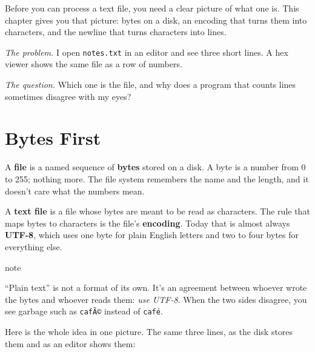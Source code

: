 
\begin{chapterintro}

Before you can process a text file, you need a clear picture of what one is. This chapter gives you that picture: bytes on a disk, an encoding that turns them into characters, and the newline that turns characters into lines.

\end{chapterintro}

\emph{The problem.} I open \texttt{notes.txt} in an editor and see three short lines. A hex viewer shows the same file as a row of numbers.

\emph{The question.} Which one is the file, and why does a program that counts lines sometimes disagree with my eyes?

\section{Bytes First}\label{01-what-a-text-file-is:bytes-first}

A \textbf{file} is a named sequence of \textbf{bytes} stored on a disk. A byte is a number from 0 to 255; nothing more. The file system remembers the name and the length, and it doesn't care what the numbers mean.

A \textbf{text file} is a file whose bytes are meant to be read as characters. The rule that maps bytes to characters is the file's \textbf{encoding}. Today that is almost always \textbf{UTF-8}, which uses one byte for plain English letters and two to four bytes for everything else.

\begin{callout}{note}

``Plain text'' is not a format of its own. It's an agreement between whoever wrote the bytes and whoever reads them: \emph{use UTF-8}. When the two sides disagree, you see garbage such as \texttt{cafÃ©} instead of \texttt{café}.

\end{callout}


Here is the whole idea in one picture. The same three lines, as the disk stores them and as an editor shows them:

